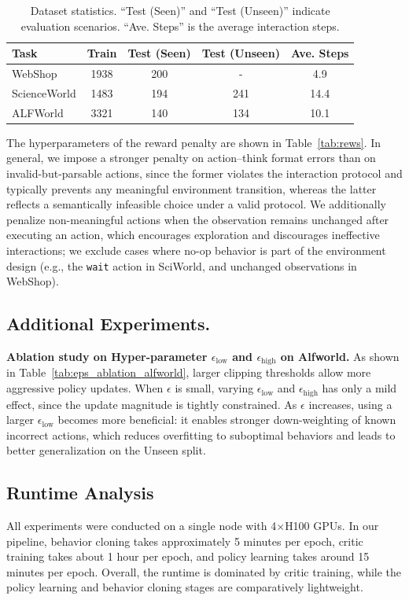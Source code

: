 \begin{table}[t]
\centering
\small
\setlength{\tabcolsep}{3pt}
\caption{Dataset statistics. ``Test (Seen)'' and ``Test (Unseen)'' indicate evaluation scenarios. ``Ave. Steps'' is the average interaction steps.}
\begin{tabular}{lcccc}
\toprule
 \textbf{Task} & \textbf{Train} &  \textbf{Test (Seen)} &  \textbf{Test (Unseen)} & \textbf{Ave. Steps} \\
\midrule
WebShop      & 1938 & 200 & -   & 4.9 \\
ScienceWorld & 1483 & 194 & 241 & 14.4 \\
ALFWorld     & 3321 & 140 & 134 & 10.1 \\
\bottomrule
\end{tabular}
\label{tab:tasks}
\end{table}

The hyperparameters of the reward penalty are shown in Table~\ref{tab:rews}. In general, we impose a stronger penalty on action--think format errors than on invalid-but-parsable actions, since the former violates the interaction protocol and typically prevents any meaningful environment transition, whereas the latter reflects a semantically infeasible choice under a valid protocol. We additionally penalize non-meaningful actions when the observation remains unchanged after executing an action, which encourages exploration and discourages ineffective interactions; we exclude cases where no-op behavior is part of the environment design (e.g., the \texttt{wait} action in SciWorld, and unchanged observations in WebShop). 



\subsection{Additional Experiments.}
\label{app:additional_results}
\textbf{Ablation study on Hyper-parameter $\epsilon_{\text{low}}$ and $\epsilon_{\text{high}}$ on Alfworld.}
As shown in Table~\ref{tab:eps_ablation_alfworld}, larger clipping thresholds allow more aggressive policy updates. When $\epsilon$ is small, varying $\epsilon_{\text{low}}$ and $\epsilon_{\text{high}}$ has only a mild effect, since the update magnitude is tightly constrained. As $\epsilon$ increases, using a larger $\epsilon_{\text{low}}$ becomes more beneficial: it enables stronger down-weighting of known incorrect actions, which reduces overfitting to suboptimal behaviors and leads to better generalization on the Unseen split.


\subsection{Runtime Analysis}
All experiments were conducted on a single node with 4$\times$H100 GPUs.
In our pipeline, behavior cloning takes approximately 5 minutes per epoch, critic training takes about 1 hour per epoch, and policy learning takes around 15 minutes per epoch.
Overall, the runtime is dominated by critic training, while the policy learning and behavior cloning stages are comparatively lightweight.
